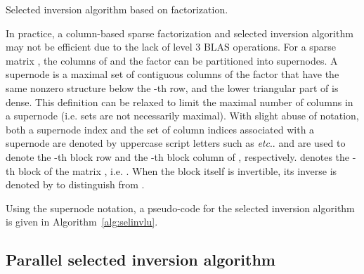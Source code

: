 \documentclass{acm_proc_article-sp}
\newcommand{\etc}{\textit{etc}.\xspace}
\begin{document}
\begin{algorithm}
  \DontPrintSemicolon
  \caption{Selected inversion algorithm based on  factorization.}
  \label{alg:selinvlu}




\end{algorithm}


In practice, a column-based sparse factorization and selected
inversion algorithm may not be efficient due to the lack of level 3 BLAS 
operations.  For a sparse matrix , 
the columns of  and the  factor can be
partitioned into supernodes. A supernode is a maximal set of contiguous
columns  of the  factor that have the
same nonzero structure below the -th row, and the lower
triangular part of  is dense. This definition can be 
relaxed to limit the maximal number of columns in a supernode (i.e. sets are not necessarily maximal).
With slight abuse of notation, both a supernode index and the set
of column indices associated with a supernode are denoted by uppercase
script letters such as  \etc.
 and  are used to
denote the -th block row and the -th block column of ,
respectively.  denotes the -th block of the
matrix , i.e. .  When
the block  itself is invertible, its inverse is denoted by
 to distinguish from .

Using the supernode notation, a pseudo-code for the selected inversion 
algorithm is given in Algorithm~\ref{alg:selinvlu}.  


\subsection{Parallel selected inversion algorithm} \label{sec:pselinv}
\end{document}

